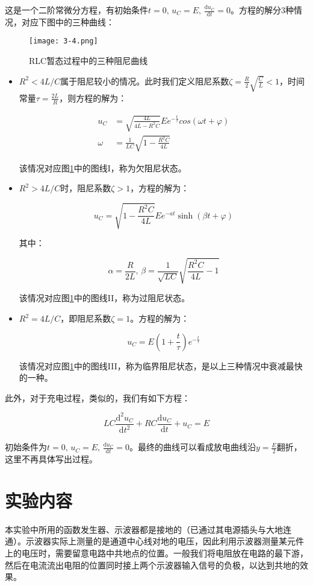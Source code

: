 \documentclass[12pt]{article}
\begin{document}
这是一个二阶常微分方程，有初始条件$t=0,\,u_C=E,\,\frac{\mathrm{d}u_C}{\mathrm{d}t}=0$。方程的解分3种情况，对应下图中的三种曲线：

\begin{figure}[htbp]\label{fig:4}
    \centering
    \texttt{[image: 3-4.png]}
    \caption{RLC暂态过程中的三种阻尼曲线}
\end{figure}

\begin{itemize}
    \item $R^2<4L/C$属于阻尼较小的情况。此时我们定义阻尼系数$\zeta=\frac{R}{2}\sqrt{\frac{C}{L}}<1$，时间常量$\tau=\frac{2L}{R}$，则方程的解为：
    
    \[
        \begin{aligned}
            u_C&=\sqrt{\frac{4L}{4L-R^2C}}Ee^{-\frac{t}{\tau}}cos(\omega t+\varphi) \\
            \omega&=\frac{1}{LC}\sqrt{1-\frac{R^2C}{4L}}
        \end{aligned}
    \]

    该情况对应图\ref{fig:4}中的图线I，称为欠阻尼状态。

    \item $R^2>4L/C$时，阻尼系数$\zeta>1$，方程的解为：
    
    \[
        u_C=\sqrt{1-\frac{R^2C}{4L}}Ee^{-at}\sinh(\beta t+\varphi)
    \]

    其中：

    \[
        \alpha=\frac{R}{2L},\,\beta=\frac{1}{\sqrt{LC}}\sqrt{\frac{R^2C}{4L}-1}
    \]

    该情况对应图\ref{fig:4}中的图线II，称为过阻尼状态。

    \item $R^2=4L/C$，即阻尼系数$\zeta=1$。方程的解为：
    
    \[
        u_C=E(1+\frac{t}{\tau})e^{-\frac{t}{\tau}}
    \]

    该情况对应图\ref{fig:4}中的图线III，称为临界阻尼状态，是以上三种情况中衰减最快的一种。
\end{itemize}

此外，对于充电过程，类似的，我们有如下方程：

\[
    LC\frac{\mathrm{d}^2u_C}{\mathrm{d}t^2}+RC\frac{\mathrm{d}u_C}{\mathrm{d}t}+u_C=E
\]

初始条件为$t=0,\,u_C=E,\,\frac{\mathrm{d}u_C}{\mathrm{d}t}=0$。最终的曲线可以看成放电曲线沿$y=\frac{E}{2}$翻折，这里不再具体写出过程。

\section{实验内容}
本实验中所用的函数发生器、示波器都是接地的（已通过其电源插头与大地连通）。示波器实际上测量的是通道中心线对地的电压，因此利用示波器测量某元件上的电压时，需要留意电路中共地点的位置。一般我们将电阻放在电路的最下游，然后在电流流出电阻的位置同时接上两个示波器输入信号的负极，以达到共地的效果。
\end{document}
